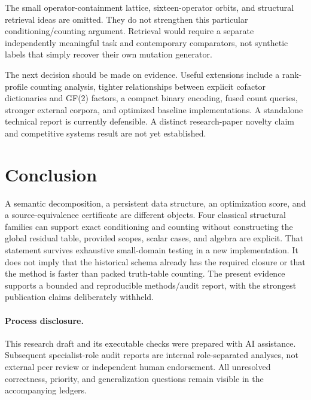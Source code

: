 \documentclass[11pt]{article}
\theoremstyle{definition}\newtheorem{definition}[theorem]{Definition}
\theoremstyle{remark}\newtheorem{remark}[theorem]{Remark}
\begin{document}
The small operator-containment lattice, sixteen-operator orbits, and structural retrieval ideas are omitted. They do not strengthen this particular conditioning/counting argument. Retrieval would require a separate independently meaningful task and contemporary comparators, not synthetic labels that simply recover their own mutation generator.

The next decision should be made on evidence. Useful extensions include a rank-profile counting analysis, tighter relationships between explicit cofactor dictionaries and GF(2) factors, a compact binary encoding, fused count queries, stronger external corpora, and optimized baseline implementations. A standalone technical report is currently defensible. A distinct research-paper novelty claim and competitive systems result are not yet established.

\section{Conclusion}
A semantic decomposition, a persistent data structure, an optimization score, and a source-equivalence certificate are different objects. Four classical structural families can support exact conditioning and counting without constructing the global residual table, provided scopes, scalar cases, and algebra are explicit. That statement survives exhaustive small-domain testing in a new implementation. It does not imply that the historical schema already has the required closure or that the method is faster than packed truth-table counting. The present evidence supports a bounded and reproducible methods/audit report, with the strongest publication claims deliberately withheld.

\paragraph{Process disclosure.}
This research draft and its executable checks were prepared with AI assistance. Subsequent specialist-role audit reports are internal role-separated analyses, not external peer review or independent human endorsement. All unresolved correctness, priority, and generalization questions remain visible in the accompanying ledgers.


\end{document}
